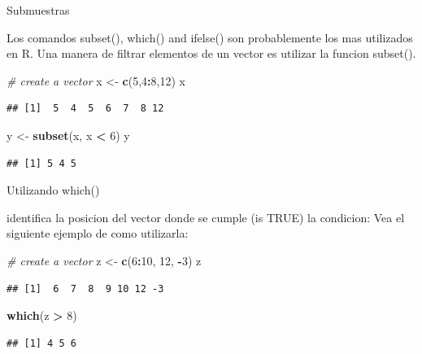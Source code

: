 \documentclass[ignorenonframetext,]{beamer}
\newenvironment{Shaded}{\begin{snugshade}}{\end{snugshade}}
\newcommand{\KeywordTok}[1]{\textcolor[rgb]{0.13,0.29,0.53}{\textbf{#1}}}
\newcommand{\DecValTok}[1]{\textcolor[rgb]{0.00,0.00,0.81}{#1}}
\newcommand{\StringTok}[1]{\textcolor[rgb]{0.31,0.60,0.02}{#1}}
\newcommand{\CommentTok}[1]{\textcolor[rgb]{0.56,0.35,0.01}{\textit{#1}}}
\newcommand{\OperatorTok}[1]{\textcolor[rgb]{0.81,0.36,0.00}{\textbf{#1}}}
\newcommand{\NormalTok}[1]{#1}
\begin{document}
\begin{frame}[fragile]{Submuestras}

Los comandos subset(), which() and ifelse() son probablemente los mas
utilizados en R. Una manera de filtrar elementos de un vector es
utilizar la funcion subset().

\begin{Shaded}
\begin{Highlighting}[]
\CommentTok{# create a vector}
\NormalTok{x <-}\StringTok{ }\KeywordTok{c}\NormalTok{(}\DecValTok{5}\NormalTok{,}\DecValTok{4}\OperatorTok{:}\DecValTok{8}\NormalTok{,}\DecValTok{12}\NormalTok{)}
\NormalTok{x}
\end{Highlighting}
\end{Shaded}

\begin{verbatim}
## [1]  5  4  5  6  7  8 12
\end{verbatim}

\begin{Shaded}
\begin{Highlighting}[]
\NormalTok{y <-}\StringTok{ }\KeywordTok{subset}\NormalTok{(x, x }\OperatorTok{<}\StringTok{ }\DecValTok{6}\NormalTok{)}
\NormalTok{y}
\end{Highlighting}
\end{Shaded}

\begin{verbatim}
## [1] 5 4 5
\end{verbatim}

\end{frame}

\begin{frame}[fragile]{Utilizando which()}

identifica la posicion del vector donde se cumple (is TRUE) la
condicion: Vea el siguiente ejemplo de como utilizarla:

\begin{Shaded}
\begin{Highlighting}[]
\CommentTok{# create a vector}
\NormalTok{z <-}\StringTok{ }\KeywordTok{c}\NormalTok{(}\DecValTok{6}\OperatorTok{:}\DecValTok{10}\NormalTok{, }\DecValTok{12}\NormalTok{, }\OperatorTok{-}\DecValTok{3}\NormalTok{)}
\NormalTok{z}
\end{Highlighting}
\end{Shaded}

\begin{verbatim}
## [1]  6  7  8  9 10 12 -3
\end{verbatim}

\begin{Shaded}
\begin{Highlighting}[]
\KeywordTok{which}\NormalTok{(z }\OperatorTok{>}\StringTok{ }\DecValTok{8}\NormalTok{)}
\end{Highlighting}
\end{Shaded}

\begin{verbatim}
## [1] 4 5 6
\end{verbatim}

\end{frame}
\end{document}
